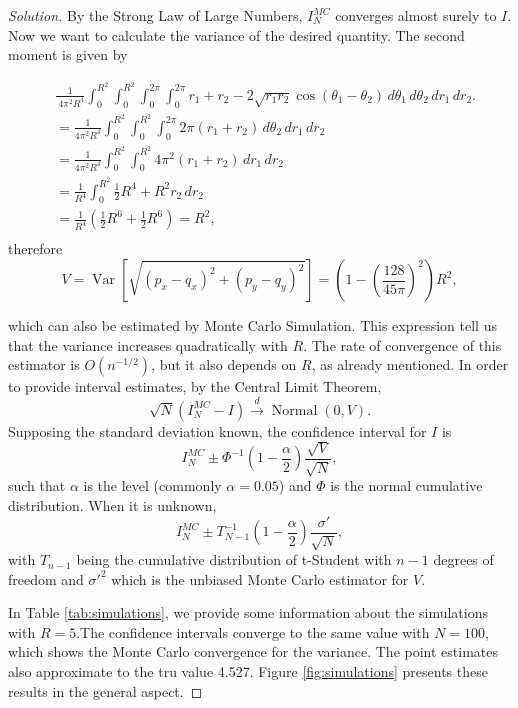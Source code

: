\documentclass[a4paper,10pt, notitlepage]{report}
\newcommand{\var}{\operatorname{Var}}
\begin{document}
\begin{enumerate}
\begin{proof}[Solution]
By the Strong Law of Large Numbers, $I_N^{MC}$ converges almost surely to $I$.
Now we want to calculate the variance of the desired quantity. The second
moment is given by 

\begin{align*}
    &\frac{1}{\
    4\pi^2 R^4}\int_{0}^{R^2}\int_{0}^{R^2}\int_{0}^{2\pi}\int_{0}^{2\pi}r_1 + r_2 - 2\sqrt{r_1r_2}\cos(\theta_1 -\theta_2)
    \,d\theta_1\,d\theta_2\,dr_1\,dr_2. \\
    &= \frac{1}{4\pi^2 R^4}\int_{0}^{R^2}\int_{0}^{R^2}\int_{0}^{2\pi} 2\pi(r_1+r_2) \,d\theta_2\,dr_1\,dr_2 \\ 
    &= \frac{1}{4\pi^2 R^4}\int_{0}^{R^2}\int_{0}^{R^2} 4\pi^2(r_1+r_2) \,dr_1\,dr_2 \\
    &= \frac{1}{R^4}\int_{0}^{R^2} \frac{1}{2}R^4 + R^2r_2 \,dr_2 \\
    &= \frac{1}{R^4}(\frac{1}{2}R^6 + \frac{1}{2}R^6) = R^2, \\
\end{align*}
therefore 
$$
V = \var\left[\sqrt{(p_x - q_x)^2 + (p_y - q_y)^2}\right] = \left(1 - \left(\frac{128}{45\pi}\right)^2\right)R^2,
$$

which can also be estimated by Monte Carlo Simulation. This expression tell us
that the variance increases quadratically with $R$. The rate of convergence of
this estimator is $O(n^{-1/2})$, but it also depends on $R$, as already
mentioned. In order to provide interval estimates, by the Central Limit
Theorem, 
$$\sqrt{N}(I_N^{MC} - I) \overset{d}{\to} \operatorname{Normal}(0, V).$$
Supposing the standard deviation known, the confidence interval for $I$ is
$$I_N^{MC} \pm \Phi^{-1}\left(1 - \frac{\alpha}{2}\right)\frac{\sqrt{V}}{\sqrt{N}},$$
such that $\alpha$ is the level (commonly $\alpha = 0.05$) and $\Phi$ is the
normal cumulative distribution. When it is unknown, 
$$I_N^{MC} \pm T_{N-1}^{-1}\left(1 - \frac{\alpha}{2}\right)\frac{\sigma
'}{\sqrt{N}},$$
with $T_{n-1}$ being the cumulative distribution of t-Student with $n-1$
degrees of freedom and $\sigma '^2$ which is the unbiased Monte Carlo estimator
for $V$.

In Table \ref{tab:simulations}, we provide some information about the simulations with $R
= 5$.The confidence intervals converge to the same value with $N = 100$, which
shows the Monte Carlo convergence for the variance. The point estimates also
approximate to the tru value 4.527. Figure \ref{fig:simulations} presents
these results in the general aspect. 


\end{proof}
\end{enumerate}
\end{document}
